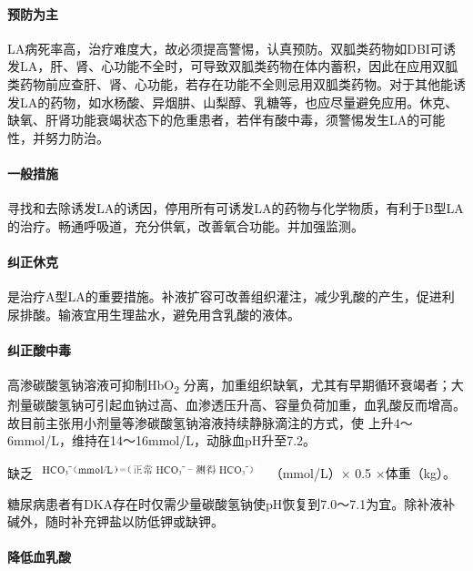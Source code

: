 \paragraph{预防为主}

LA病死率高，治疗难度大，故必须提高警惕，认真预防。双胍类药物如DBI可诱发LA，肝、肾、心功能不全时，可导致双胍类药物在体内蓄积，因此在应用双胍类药物前应查肝、肾、心功能，若存在功能不全则忌用双胍类药物。对于其他能诱发LA的药物，如水杨酸、异烟肼、山梨醇、乳糖等，也应尽量避免应用。休克、缺氧、肝肾功能衰竭状态下的危重患者，若伴有酸中毒，须警惕发生LA的可能性，并努力防治。

\paragraph{一般措施}

寻找和去除诱发LA的诱因，停用所有可诱发LA的药物与化学物质，有利于B型LA的治疗。畅通呼吸道，充分供氧，改善氧合功能。并加强监测。

\paragraph{纠正休克}

是治疗A型LA的重要措施。补液扩容可改善组织灌注，减少乳酸的产生，促进利尿排酸。输液宜用生理盐水，避免用含乳酸的液体。

\paragraph{纠正酸中毒}

高渗碳酸氢钠溶液可抑制HbO\textsubscript{2}
分离，加重组织缺氧，尤其有早期循环衰竭者；大剂量碳酸氢钠可引起血钠过高、血渗透压升高、容量负荷加重，血乳酸反而增高。故目前主张用小剂量等渗碳酸氢钠溶液持续静脉滴注的方式，使{}
上升4～6mmol/L，维持在14～16mmol/L，动脉血pH升至7.2。

缺乏\includegraphics[width=2.66667in,height=0.17708in]{./images/Image00176.jpg}
（mmol/L）× 0.5 ×体重（kg）。

糖尿病患者有DKA存在时仅需少量碳酸氢钠使pH恢复到7.0～7.1为宜。除补液补碱外，随时补充钾盐以防低钾或缺钾。

\paragraph{降低血乳酸}

